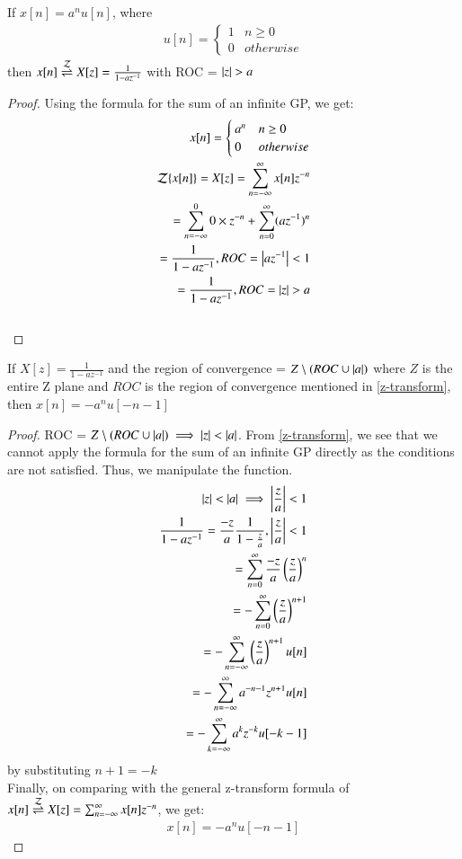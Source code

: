 \documentclass[journal,12pt,twocolumn]{IEEEtran}
\begin{document}
\begin{lemma}
If $x[n] = a^nu[n]$, where 
\begin{align}
    u[n] = 
    \begin{cases}
    1 & n \geq 0\\
    0 & otherwise
    \end{cases}
\end{align}
then $x[n] \overset{\mathcal{Z}}{ \rightleftharpoons} X[z] = \frac{1}{1 - az^{-1}}$ with ROC = $\left\vert z\right\vert>a$
\label{z-transform}
\end{lemma}
\begin{proof}
Using the formula for the sum of an infinite GP, we get:
\begin{align}
    x[n] = 
    \begin{cases}
    a^n & n\geq 0\\
    0 & otherwise
    \end{cases}\\
    \mathcal{Z}\{x[n]\} = X[z] = \sum_{n = -\infty}^\infty x[n]z^{-n}\\
    = \sum_{n = -\infty}^0 0 \times z^{-n} + \sum_{n = 0}^{\infty} (az^{-1})^n\\
     = \frac{1}{1 - az^{-1}} , ROC = \left\vert az^{-1}\right\vert < 1\\
      = \frac{1}{1 - az^{-1}} , ROC =  \left\vert z\right\vert > a
\end{align}\\ 

\end{proof}
\begin{lemma}
If $X[z] = \frac{1}{1 - az^{-1}}$ and the region of convergence = $Z \setminus (ROC \cup \left\vert a\right\vert)$ where $Z$ is the entire Z plane and $ROC$ is the region of convergence mentioned in \eqref{z-transform}, then $x[n] = -a^nu[-n-1]$
\label{ROC-violation}
\end{lemma}
\begin{proof}
ROC =  $Z \setminus (ROC \cup \left\vert a\right\vert) \implies \left\vert z\right\vert  < \left\vert a\right\vert$. From \eqref{z-transform}, we see that we cannot apply the formula for the sum of an infinite GP directly as the conditions are not satisfied. Thus, we manipulate the function.
\begin{align}
    \left\vert z\right\vert  < \left\vert a\right\vert \implies \left\vert\frac{z}{a}\right\vert < 1\\
    \frac{1}{1 - az^{-1}} = \frac{-z}{a}\frac{1}{1 - \frac{z}{a}} , \left\vert\frac{z}{a}\right\vert < 1\\
     = \sum_{n = 0}^\infty \frac{-z}{a} \left(\frac{z}{a}\right)^n\\
      = - \sum_{n = 0}^\infty  \left(\frac{z}{a}\right)^{n+1}\\
       = - \sum_{n = -\infty}^\infty  \left(\frac{z}{a}\right)^{n+1}u[n]\\
     = -\sum_{n = -\infty}^\infty  a^{-n-1}z^{n+1}u[n]\\
      = -\sum_{k = -\infty}^\infty  a^{k}z^{-k}u[-k-1]
\end{align}
by substituting $n+1 = -k$\\
Finally, on comparing with the general z-transform formula of $x[n] \overset{\mathcal{Z}}{ \rightleftharpoons} X[z] = \sum_{n = -\infty}^\infty x[n]z^{-n}$, we get:
\begin{align}
    x[n] = -a^nu[-n-1]
\end{align}
\end{proof}
\end{document}
